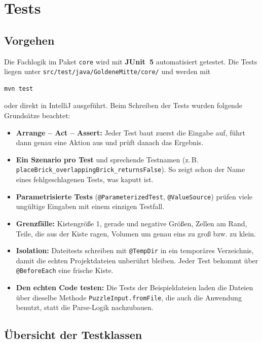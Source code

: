 \documentclass[11pt,a4paper,parskip=half]{scrartcl}
\newcommand{\code}[1]{\texttt{#1}}
\newcommand{\file}[1]{\texttt{#1}}
\begin{document}
\section{Tests}

\subsection{Vorgehen}

Die Fachlogik im Paket \code{core} wird mit \textbf{JUnit~5} automatisiert getestet.
Die Tests liegen unter \file{src/test/java/GoldeneMitte/core/} und werden mit
\begin{lstlisting}
mvn test
\end{lstlisting}
oder direkt in IntelliJ ausgeführt. Beim Schreiben der Tests wurden folgende
Grundsätze beachtet:
\begin{itemize}
  \item \textbf{Arrange -- Act -- Assert:} Jeder Test baut zuerst die Eingabe auf,
        führt dann genau eine Aktion aus und prüft danach das Ergebnis.
  \item \textbf{Ein Szenario pro Test} und sprechende Testnamen
        (z.\,B. \code{placeBrick\_\allowbreak overlappingBrick\_\allowbreak returnsFalse}). So zeigt schon
        der Name eines fehlgeschlagenen Tests, was kaputt ist.
  \item \textbf{Parametrisierte Tests} (\code{@ParameterizedTest},
        \code{@ValueSource}) prüfen viele ungültige Eingaben mit einem einzigen
        Testfall.
  \item \textbf{Grenzfälle:} Kistengröße 1, gerade und negative Größen, Zellen am
        Rand, Teile, die aus der Kiste ragen, Volumen um genau eins zu groß bzw. zu
        klein.
  \item \textbf{Isolation:} Dateitests schreiben mit \code{@TempDir} in ein
        temporäres Verzeichnis, damit die echten Projektdateien unberührt bleiben.
        Jeder Test bekommt über \code{@BeforeEach} eine frische Kiste.
  \item \textbf{Den echten Code testen:} Die Tests der Beispieldateien laden die
        Dateien über dieselbe Methode \code{PuzzleInput.fromFile}, die auch die
        Anwendung benutzt, statt die Parse-Logik nachzubauen.
\end{itemize}

\subsection{Übersicht der Testklassen}
\end{document}
